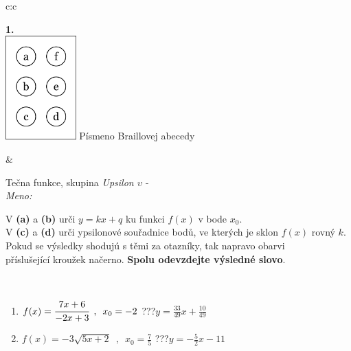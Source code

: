 \documentclass[10pt]{report}
\begin{document}
\begin{tabular}{c:c}
\begin{minipage}[c][104.5mm][t]{0.5\linewidth}
\begin{center}
\begin{minipage}{0.20\linewidth}
\begin{center}
{\Huge\bfseries 1.} \\[2mm]
\includegraphics[height=40mm]{../images/braille.png}
{\small Písmeno Braillovej abecedy}
\end{center}
\end{minipage}
\end{center}
\end{minipage}
&
\begin{minipage}[c][104.5mm][t]{0.5\linewidth}
\begin{center}
\vspace{7mm}
{\huge Tečna funkce, skupina \textit{Upsilon $\upsilon$} -}\\[5mm]
\textit{Meno:}\phantom{xxxxxxxxxxxxxxxxxxxxxxxxxxxxxxxxxxxxxxxxxxxxxxxxxxxxxxxxxxxxxxxxx}\\[5mm]
\begin{minipage}{0.95\linewidth}
\begin{center}
V \textbf{(a)} a \textbf{(b)} urči  $y = kx + q$ ku funkci $f(x)$ v bode $x_0$.\\V \textbf{(c)} a \textbf{(d)} urči ypsilonové souřadnice bodů, ve kterých je sklon $f(x)$ rovný $k$.\\Pokud se výsledky shodujú s těmi za otazníky, tak napravo obarvi\\příslušející kroužek načerno. \textbf{Spolu odevzdejte výsledné slovo}.
\end{center}
\end{minipage}
\\[1mm]
\begin{minipage}{0.79\linewidth}
\begin{center}
\begin{varwidth}{\linewidth}
\begin{enumerate}
\small
\item $f(x)=\cfrac{7x+6}{-2x+3}\enspace , \enspace x_0=-2$\quad \dotfill\; ???\;\dotfill \quad $y = \frac{33}{49}x+\frac{10}{49}$
\item $f(x)=-3\sqrt{5x+2}\enspace , \enspace x_0=\frac{7}{5}$\quad \dotfill\; ???\;\dotfill \quad $y = -\frac{5}{2}x-11$

\end{enumerate}
\end{varwidth}
\end{center}
\end{minipage}
\end{center}
\end{minipage}
\end{tabular}
\end{document}
